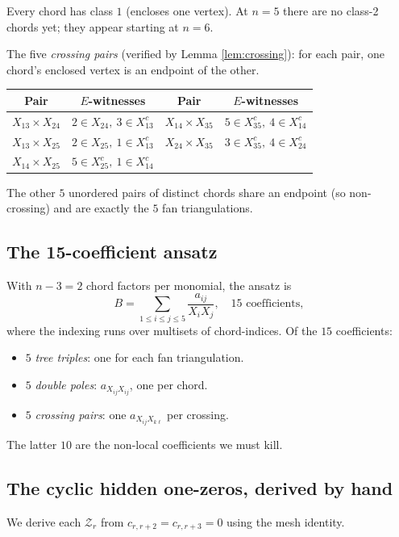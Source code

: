 \documentclass[11pt]{article}
\newcommand{\X}[2]{X_{#1#2}}
\newcommand{\Z}{\mathcal{Z}}
\theoremstyle{definition}
\begin{document}
Every chord has class $1$ (encloses one vertex). At $n=5$ there are no
class-2 chords yet; they appear starting at $n=6$.

The five \emph{crossing pairs} (verified by Lemma \ref{lem:crossing}): for each
pair, one chord's enclosed vertex is an endpoint of the other.
\begin{center}
\begin{tabular}{cccc}
\toprule
Pair & $E$-witnesses & Pair & $E$-witnesses \\
\midrule
$\X{1}{3}\times\X{2}{4}$ & $2\in\X{2}{4},\ 3\in\X{1}{3}^c$ &
$\X{1}{4}\times\X{3}{5}$ & $5\in\X{3}{5}^c,\ 4\in\X{1}{4}^c$ \\
$\X{1}{3}\times\X{2}{5}$ & $2\in\X{2}{5},\ 1\in\X{1}{3}^c$ &
$\X{2}{4}\times\X{3}{5}$ & $3\in\X{3}{5}^c,\ 4\in\X{2}{4}^c$ \\
$\X{1}{4}\times\X{2}{5}$ & $5\in\X{2}{5}^c,\ 1\in\X{1}{4}^c$ & & \\
\bottomrule
\end{tabular}
\end{center}

The other $5$ unordered pairs of distinct chords share an endpoint (so
non-crossing) and are exactly the $5$ fan triangulations.

\subsection{The 15-coefficient ansatz}

With $n-3=2$ chord factors per monomial, the ansatz is
\[
B = \sum_{1\le i\le j\le 5}\frac{a_{ij}}{X_i X_j},\quad\text{15 coefficients},
\]
where the indexing runs over multisets of chord-indices. Of the $15$ coefficients:
\begin{itemize}[nosep,leftmargin=2em]
\item $5$ \emph{tree triples}: one for each fan triangulation.
\item $5$ \emph{double poles}: $a_{\X{i}{j}\X{i}{j}}$, one per chord.
\item $5$ \emph{crossing pairs}: one $a_{\X{i}{j}\X{k}{\ell}}$ per crossing.
\end{itemize}
The latter $10$ are the non-local coefficients we must kill.

\subsection{The cyclic hidden one-zeros, derived by hand}

We derive each $\Z_r$ from $c_{r,r+2}=c_{r,r+3}=0$ using the mesh identity.
\end{document}
